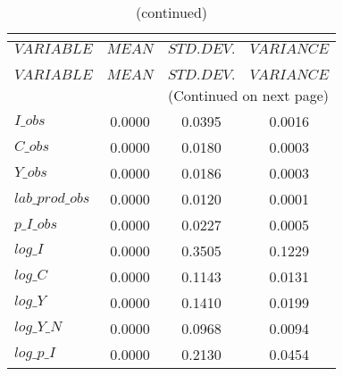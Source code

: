  
\begin{center}
\begin{longtable}{lccc} 
\caption{THEORETICAL MOMENTS}\\
 \label{Table:th_moments}\\
\toprule 
$VARIABLE        $	 & 	 $         MEAN$	 & 	 $    STD. DEV.$	 & 	 $     VARIANCE$\\
\midrule \endfirsthead 
\caption{(continued)}\\
 \toprule \\ 
$VARIABLE        $	 & 	 $         MEAN$	 & 	 $    STD. DEV.$	 & 	 $     VARIANCE$\\
\midrule \endhead 
\midrule \multicolumn{4}{r}{(Continued on next page)} \\ \bottomrule \endfoot 
\bottomrule \endlastfoot 
$I\_obs          $	 & 	       0.0000	 & 	       0.0395	 & 	       0.0016 \\ 
$C\_obs          $	 & 	       0.0000	 & 	       0.0180	 & 	       0.0003 \\ 
$Y\_obs          $	 & 	       0.0000	 & 	       0.0186	 & 	       0.0003 \\ 
$lab\_prod\_obs  $	 & 	       0.0000	 & 	       0.0120	 & 	       0.0001 \\ 
$p\_I\_obs       $	 & 	       0.0000	 & 	       0.0227	 & 	       0.0005 \\ 
$log\_I          $	 & 	       0.0000	 & 	       0.3505	 & 	       0.1229 \\ 
$log\_C          $	 & 	       0.0000	 & 	       0.1143	 & 	       0.0131 \\ 
$log\_Y          $	 & 	       0.0000	 & 	       0.1410	 & 	       0.0199 \\ 
$log\_Y\_N       $	 & 	       0.0000	 & 	       0.0968	 & 	       0.0094 \\ 
$log\_p\_I       $	 & 	       0.0000	 & 	       0.2130	 & 	       0.0454 \\ 
\end{longtable}
 \end{center}
